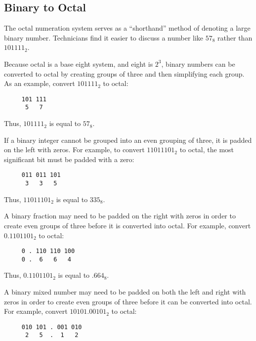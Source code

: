 \subsection{Binary to Octal}
\label{MF:sub:binary_to_octal}
The octal numeration system serves as a ``shorthand'' method of denoting a large binary number. Technicians find it easier to discuss a number like $ 57_8 $ rather than $ 101111_2 $.

Because octal is a base eight system, and eight is $ 2^3 $, binary numbers can be converted to octal by creating groups of three and then simplifying each group. As an example, convert $ 101111_2 $ to octal: 

\begin{verbatim}
     101 111
      5   7 
\end{verbatim}

Thus, $ 101111_2 $ is equal to $ 57_8 $.

If a binary integer cannot be grouped into an even grouping of three, it is padded on the left with zeros. For example, to convert $ 11011101_2 $ to octal, the most significant bit must be padded with a zero:

\begin{verbatim}
     011 011 101
      3   3   5 
\end{verbatim}

Thus, $ 11011101_2 $ is equal to $ 335_8 $. 

A binary fraction may need to be padded on the right with zeros in order to create even groups of three before it is converted into octal. For example, convert $ 0.1101101_2 $ to octal: 

\begin{verbatim}
     0 . 110 110 100
     0 .  6   6   4 
\end{verbatim}

Thus, $ 0.1101101_2 $ is equal to $ .664_8 $. 

A binary mixed number may need to be padded on both the left and right with zeros in order to create even groups of three before it can be converted into octal. For example, convert $ 10101.00101_2 $ to octal: 

\begin{verbatim}
     010 101 . 001 010
      2   5  .  1   2 
\end{verbatim}

